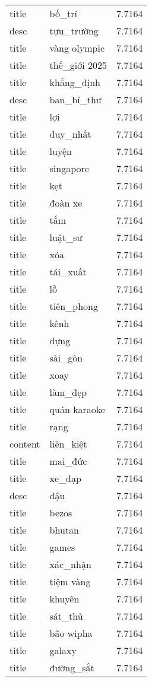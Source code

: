 \documentclass{article}
\begin{document}
\begin{tabular}{lll}
title & bố\_trí & 7.7164\\
desc & tựu\_trường & 7.7164\\
title & vàng olympic & 7.7164\\
title & thế\_giới 2025 & 7.7164\\
title & khẳng\_định & 7.7164\\
desc & ban\_bí\_thư & 7.7164\\
title & lợi & 7.7164\\
title & duy\_nhất & 7.7164\\
title & luyện & 7.7164\\
title & singapore & 7.7164\\
title & kẹt & 7.7164\\
title & đoàn xe & 7.7164\\
title & tắm & 7.7164\\
title & luật\_sư & 7.7164\\
title & xóa & 7.7164\\
title & tái\_xuất & 7.7164\\
title & lỗ & 7.7164\\
title & tiên\_phong & 7.7164\\
title & kênh & 7.7164\\
title & dựng & 7.7164\\
title & sài\_gòn & 7.7164\\
title & xoay & 7.7164\\
title & làm\_đẹp & 7.7164\\
title & quán karaoke & 7.7164\\
title & rạng & 7.7164\\
content & liên\_kiệt & 7.7164\\
title & mai\_đức & 7.7164\\
title & xe\_đạp & 7.7164\\
desc & đậu & 7.7164\\
title & bezos & 7.7164\\
title & bhutan & 7.7164\\
title & games & 7.7164\\
title & xác\_nhận & 7.7164\\
title & tiệm vàng & 7.7164\\
title & khuyên & 7.7164\\
title & sát\_thủ & 7.7164\\
title & bão wipha & 7.7164\\
title & galaxy & 7.7164\\
title & đường\_sắt & 7.7164\\

\end{tabular}
\end{document}
